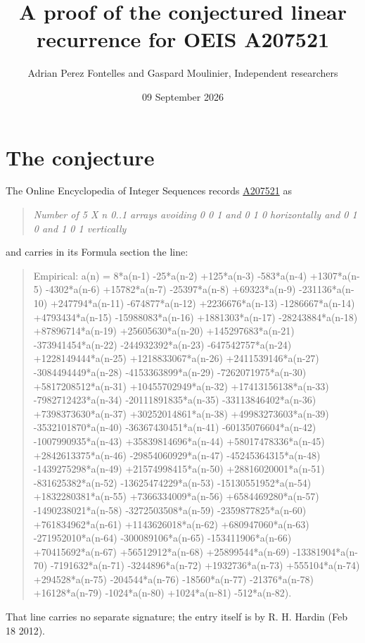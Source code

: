 \documentclass[11pt]{article}
\title{A proof of the conjectured linear recurrence for OEIS A207521}
\author{Adrian Perez Fontelles and Gaspard Moulinier, Independent researchers}
\date{09 September 2026}
\theoremstyle{definition}
\begin{document}
\maketitle
\section{The conjecture}

The Online Encyclopedia of Integer Sequences records \href{https://oeis.org/A207521}{A207521} as

\begin{quote}\itshape Number of 5 X n 0..1 arrays avoiding 0 0 1 and 0 1 0 horizontally and 0 1 0 and 1 0 1 vertically\end{quote}

and carries in its Formula section the line:

\begin{quote}\ttfamily Empirical: a(n) = 8*a(n-1) -25*a(n-2) +125*a(n-3) -583*a(n-4) +1307*a(n-5) -4302*a(n-6) +15782*a(n-7) -25397*a(n-8) +69323*a(n-9) -231136*a(n-10) +247794*a(n-11) -674877*a(n-12) +2236676*a(n-13) -1286667*a(n-14) +4793434*a(n-15) -15988083*a(n-16) +1881303*a(n-17) -28243884*a(n-18) +87896714*a(n-19) +25605630*a(n-20) +145297683*a(n-21) -373941454*a(n-22) -244932392*a(n-23) -647542757*a(n-24) +1228149444*a(n-25) +1218833067*a(n-26) +2411539146*a(n-27) -3084494449*a(n-28) -4153363899*a(n-29) -7262071975*a(n-30) +5817208512*a(n-31) +10455702949*a(n-32) +17413156138*a(n-33) -7982712423*a(n-34) -20111891835*a(n-35) -33113846402*a(n-36) +7398373630*a(n-37) +30252014861*a(n-38) +49983273603*a(n-39) -3532101870*a(n-40) -36367430451*a(n-41) -60135076604*a(n-42) -1007990935*a(n-43) +35839814696*a(n-44) +58017478336*a(n-45) +2842613375*a(n-46) -29854060929*a(n-47) -45245364315*a(n-48) -1439275298*a(n-49) +21574998415*a(n-50) +28816020001*a(n-51) -831625382*a(n-52) -13625474229*a(n-53) -15130551952*a(n-54) +1832280381*a(n-55) +7366334009*a(n-56) +6584469280*a(n-57) -1490238021*a(n-58) -3272503508*a(n-59) -2359877825*a(n-60) +761834962*a(n-61) +1143626018*a(n-62) +680947060*a(n-63) -271952010*a(n-64) -300089106*a(n-65) -153411906*a(n-66) +70415692*a(n-67) +56512912*a(n-68) +25899544*a(n-69) -13381904*a(n-70) -7191632*a(n-71) -3244896*a(n-72) +1932736*a(n-73) +555104*a(n-74) +294528*a(n-75) -204544*a(n-76) -18560*a(n-77) -21376*a(n-78) +16128*a(n-79) -1024*a(n-80) +1024*a(n-81) -512*a(n-82).\end{quote}

That line carries no separate signature; the entry itself is by R. H. Hardin (Feb 18 2012).
\end{document}

